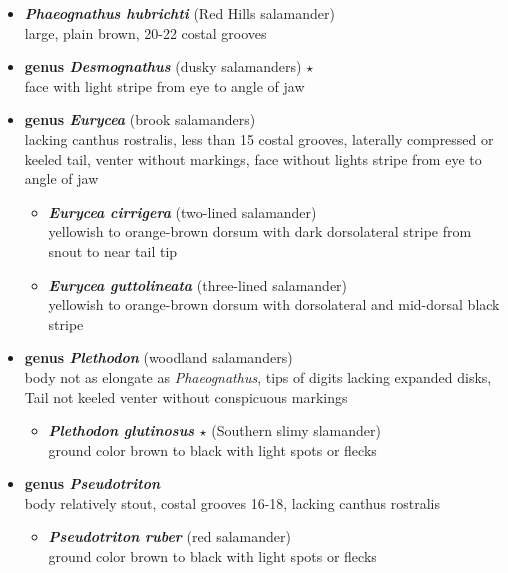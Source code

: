 \documentclass[a4paper,12pt]{article}
\begin{document}
\begin{description}
\begin{itemize}
\begin{itemize}
    \item{\textbf{\textit{   Phaeognathus hubrichti}} (Red Hills salamander)} \\ large, plain brown, 20-22 costal grooves
    \item{\textbf{genus\textit{   Desmognathus}} (dusky salamanders) $\star$} \\ face with light stripe from eye to angle of jaw
    \item{\textbf{genus\textit{   Eurycea}} (brook salamanders)} \\ lacking canthus rostralis, less than 15 costal grooves, laterally compressed or keeled tail, venter without markings, face without lights stripe from eye to angle of jaw
    \begin{itemize}
      \item{\textbf{\textit{   Eurycea cirrigera}} (two-lined salamander)} \\ yellowish to orange-brown dorsum with dark dorsolateral stripe from snout to near tail tip
      \item{\textbf{\textit{   Eurycea guttolineata}} (three-lined salamander)} \\ yellowish to orange-brown dorsum with dorsolateral and mid-dorsal black stripe
    \end{itemize}
    \item{\textbf{genus\textit{   Plethodon}} (woodland salamanders)} \\ body not as elongate as \textit{Phaeognathus}, tips of digits lacking expanded disks, Tail not keeled venter without conspicuous markings
    \begin{itemize}
      \item{\textbf{\textit{   Plethodon glutinosus} $\star$} (Southern slimy slamander)} \\ ground color brown to black with light spots or flecks
    \end{itemize}  
    \item{\textbf{genus\textit{   Pseudotriton}}} \\ body relatively stout, costal grooves 16-18, lacking canthus rostralis
    \begin{itemize}
      \item{\textbf{\textit{   Pseudotriton ruber}} (red salamander)} \\ ground color brown to black with light spots or flecks
    \end{itemize}
  \end{itemize}
\end{itemize}

\end{description}
\end{document}
